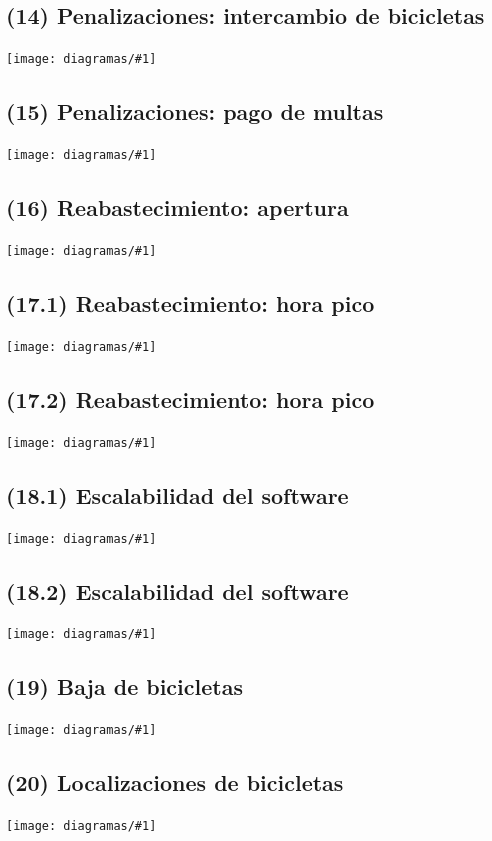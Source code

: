 \documentclass[a4paper, 10pt, twoside]{article}
\newcommand{\diagramav}[1]{
  \texttt{[image: diagramas/\#1]}
}
\begin{document}
\subsection{(14)   Penalizaciones: intercambio de bicicletas}
\diagramav{objetivos-14}

\subsection{(15)   Penalizaciones: pago de multas}
\diagramav{objetivos-15}

\subsection{(16)   Reabastecimiento: apertura}
\diagramav{objetivos-16}

\subsection{(17.1) Reabastecimiento: hora pico}
\diagramav{objetivos-17.1}

\subsection{(17.2) Reabastecimiento: hora pico}
\diagramav{objetivos-17.2}

\subsection{(18.1) Escalabilidad del software}
\diagramav{objetivos-18.1}

\subsection{(18.2) Escalabilidad del software}
\diagramav{objetivos-18.2}

\subsection{(19)   Baja de bicicletas}
\diagramav{objetivos-19}

\subsection{(20)   Localizaciones de bicicletas}
\diagramav{objetivos-20}


\end{document}
